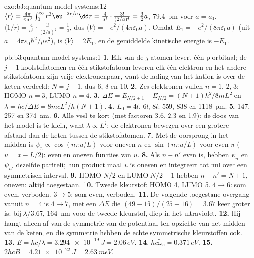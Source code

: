 \begin{solution}{exo:b3:quantum-model-systems:12}
$\langle r\rangle = \frac{4\pi}{\pi a^3}\int_0^\infty r^3\eu^{-2r/a}\dd r =
\frac{4}{a^3}\cdot\frac{3!}{(2/a)^4} = \frac32a$, \qty{79.4}{pm} voor $a = a_0$.
$\langle 1/r\rangle = \frac{4}{a^3}\cdot\frac{1!}{(2/a)^2} = \frac1a$, dus
$\langle V\rangle = -e^2/(4\pi\varepsilon_0a)$. Omdat $E_1 =
-e^2/(8\pi\varepsilon_0a)$ (uit $a = 4\pi\varepsilon_0\hbar^2/\mu e^2$),
is $\langle V\rangle = 2E_1$, en de gemiddelde kinetische energie is $-E_1$.
\end{solution}

\begin{solution}{pb:b3:quantum-model-systems:1}
\textbf{1.} Elk van de $j$ atomen levert één p-orbitaal; de $j - 1$
koolstofatomen en één stikstofatoom leveren elk één elektron en het andere
stikstofatoom zijn vrije elektronenpaar,
want de lading van het kation is over de keten verdeeld: $N = j + 1$, dus 6,
8 en 10.
\textbf{2.} Zes elektronen vullen $n = 1$, 2, 3: HOMO $n = 3$, LUMO $n = 4$.
\textbf{3.} $\Delta E = E_{N/2+1} - E_{N/2} = (N+1)h^2/8mL^2$ en $\lambda =
hc/\Delta E = 8mcL^2/h(N+1)$.
\textbf{4.} $L_0 = 4l$, $6l$, $8l$: 559, 838 en \qty{1118}{pm}.
\textbf{5.} 147, 257 en \qty{374}{nm}.
\textbf{6.} Alle veel te kort (met factoren 3.6, 2.3 en 1.9): de doos van
het model is te klein, want $\lambda \propto L^2$; de elektronen bewegen
over een grotere afstand dan de keten tussen de stikstofatomen.
\textbf{7.} Met de oorsprong in het midden is $\psi_n \propto \cos(n\pi u/L)$ voor
oneven $n$ en $\sin(n\pi u/L)$ voor even $n$ ($u = x - L/2$): even en oneven
functies van $u$.
\textbf{8.} Als $n + n'$ even is, hebben $\psi_n$ en $\psi_{n'}$ dezelfde
pariteit; hun product maal $u$ is oneven en integreert tot nul over een
symmetrisch interval.
\textbf{9.} HOMO $N/2$ en LUMO $N/2 + 1$ hebben $n + n' = N + 1$, oneven: altijd
toegestaan.
\textbf{10.} Tweede kleurstof: HOMO 4, LUMO 5. $4 \to 6$: som even, verboden.
$3 \to 5$: som even, verboden.
\textbf{11.} De volgende toegestane overgang vanuit $n = 4$ is $4 \to 7$, met
een $\Delta E$ die $(49 - 16)/(25 - 16) = 3.67$ keer groter is: bij $\lambda/3.67$,
\qty{164}{nm} voor de tweede kleurstof, diep in het ultraviolet.
\textbf{12.} Hij hangt alleen af van de symmetrie van de potentiaal ten
opzichte van het midden van de keten, en die symmetrie hebben de echte
symmetrische kleurstoffen ook.
\textbf{13.} $E = hc/\lambda = \qty{3.294e-19}{J} = \qty{2.06}{eV}$.
\textbf{14.} $hc\tilde\omega_e = \qty{0.371}{eV}$.
\textbf{15.} $2hcB = \qty{4.21e-22}{J} = \qty{2.63}{meV}$.

\end{solution}
